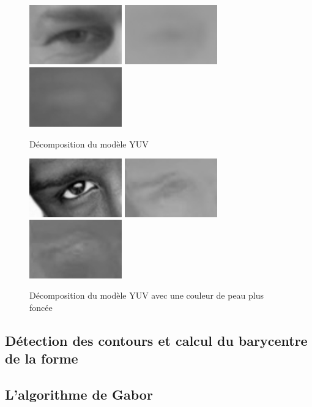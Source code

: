 \begin{figure}[H]
 \center
 \includegraphics[width=4cm]{image/luminance.png}
 \includegraphics[width=4cm]{image/chrominance1.png}
 \includegraphics[width=4cm]{image/chrominance2.png}
 \caption{Décomposition du modèle YUV}
\end{figure}

\begin{figure}[H]
 \center
 \includegraphics[width=4cm]{image/luminance_black.png}
 \includegraphics[width=4cm]{image/chrominance1_black.png}
 \includegraphics[width=4cm]{image/chrominance2_black.png}
 \caption{Décomposition du modèle YUV avec une couleur de peau plus foncée}
\end{figure}

\subsection{Détection des contours et calcul du barycentre de la forme}

\subsection{L'algorithme de Gabor}